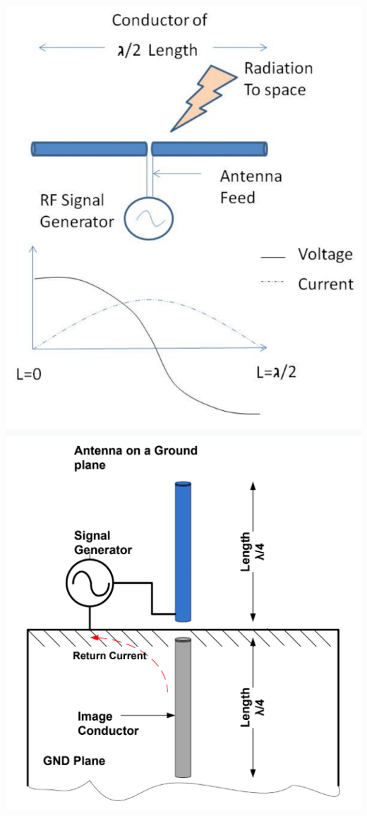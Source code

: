 \documentclass[a4paper ,12pt, onecolumn]{article}
\begin{document}
            \paragraph{}
            \includegraphics[scale=0.4]{antenna_design.png}
            \includegraphics[scale=0.5]{antenna_design_monopole.png}
\end{document}
